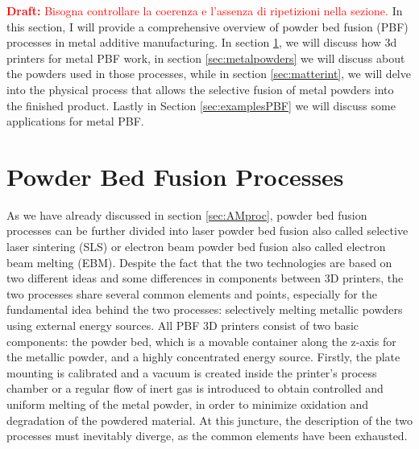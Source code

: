 \setlength{\tabcolsep}{10pt}
\textbf{\textcolor{red}{Draft:}} \textcolor{red}{Bisogna controllare la coerenza e l'assenza di ripetizioni nella sezione.}
In this section, I will provide a comprehensive overview of powder bed fusion (PBF) processes in metal additive manufacturing. In section \ref{sec:pbf_proc}, we will discuss how 3d printers for metal PBF work, in section \ref{sec:metalpowders} we will discuss about the powders used in those processes, while in section \ref{sec:matterint}, we will delve into the physical process that allows the selective fusion of metal powders into the finished product. Lastly in Section \ref{sec:examplesPBF} we will discuss some applications for metal PBF.

\section{Powder Bed Fusion Processes}\label{sec:pbf_proc}
As we have already discussed in section \ref{sec:AMproc}, powder bed fusion processes can be further divided into laser powder bed fusion also called selective laser sintering (SLS) or electron beam powder bed fusion also called electron beam melting (EBM). Despite the fact that the two technologies are based on two different ideas and some differences in components between 3D printers, the two processes share several common elements and points, especially for the fundamental idea behind the two processes: selectively melting metallic powders using external energy sources.
All PBF 3D printers consist of two basic components: the powder bed, which is a movable container along the z-axis for the metallic powder, and a highly concentrated energy source. 
Firstly, the plate mounting is calibrated and a vacuum is created inside the printer's process chamber or a regular flow of inert gas is introduced to obtain controlled and uniform melting of the metal powder, in order to minimize oxidation and degradation of the powdered material. At this juncture, the description of the two processes must inevitably diverge, as the common elements have been exhausted.

